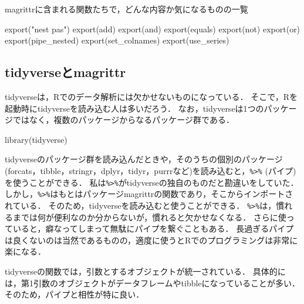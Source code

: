 \documentclass[
]{article}
\newenvironment{Shaded}{\begin{snugshade}}{\end{snugshade}}
\newcommand{\FunctionTok}[1]{\textcolor[rgb]{0.00,0.00,0.00}{#1}}
\newcommand{\NormalTok}[1]{#1}
\newcommand{\StringTok}[1]{\textcolor[rgb]{0.31,0.60,0.02}{#1}}
\begin{document}
magrittrに含まれる関数たちで，どんな内容か気になるものの一覧

\begin{Shaded}
\begin{Highlighting}[]
\FunctionTok{export}\NormalTok{(}\StringTok{"n\textquotesingle{}est pas"}\NormalTok{)}
\FunctionTok{export}\NormalTok{(add)}
\FunctionTok{export}\NormalTok{(and)}
\FunctionTok{export}\NormalTok{(equals)}
\FunctionTok{export}\NormalTok{(not)}
\FunctionTok{export}\NormalTok{(or)}
\FunctionTok{export}\NormalTok{(pipe\_nested)}
\FunctionTok{export}\NormalTok{(set\_colnames)}
\FunctionTok{export}\NormalTok{(use\_series)}
\end{Highlighting}
\end{Shaded}

\hypertarget{tidyverseux3068magrittr}{%
\subsection{tidyverseとmagrittr}\label{tidyverseux3068magrittr}}

tidyverseは，Rでのデータ解析には欠かせないものになっている．
そこで，Rを起動時にtidyverseを読み込む人は多いだろう．
なお，tidyverseは1つのパッケージではなく，複数のパッケージからなるパッケージ群である．

\begin{Shaded}
\begin{Highlighting}[]
\FunctionTok{library}\NormalTok{(tidyverse)}
\end{Highlighting}
\end{Shaded}

tidyverseのパッケージ群を読み込んだときや，そのうちの個別のパッケージ(forcats，tibble，stringr，dplyr，tidyr，purrrなど)を読み込むと，\texttt{\%\textgreater{}\%} (パイプ)を使うことができる．
私は\texttt{\%\textgreater{}\%}がtidyverseの独自のものだと勘違いをしていた．
しかし，\texttt{\%\textgreater{}\%}はもとはパッケージmagrittrの関数であり，そこからインポートされている．
そのため，tidyverseを読み込むと使うことができる．
\texttt{\%\textgreater{}\%}は，慣れるまでは何が便利なのか分からないが，慣れると欠かせなくなる．
さらに使っていると，癖なってしまって無駄にパイプを繋ぐこともある．
長過ぎるパイプは良くないのは当然であるものの，適度に使うとRでのプログラミングは非常に楽になる．

tidyverseの関数では，引数とするオブジェクトが統一されている．
具体的には，第1引数のオブジェクトがデータフレームやtibbleになっていることが多い．
そのため，パイプと相性が特に良い．
\end{document}
